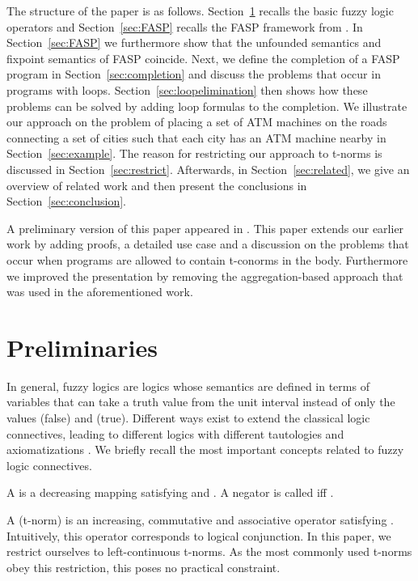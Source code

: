 \documentclass{tlp}
\begin{document}
The structure of the paper is as follows. Section~\ref{sec:prelims} recalls the basic fuzzy logic operators and Section~\ref{sec:FASP}  recalls the FASP framework from \cite{FASP:amai}. In Section~\ref{sec:FASP} we furthermore show that the unfounded semantics and fixpoint semantics of FASP coincide. Next, we define the completion of a FASP program in Section~\ref{sec:completion} and discuss the problems that occur in programs with loops. Section~\ref{sec:loopelimination} then shows how these problems can be solved by adding loop formulas to the completion. We illustrate our approach on the problem of placing a set of ATM machines on the roads connecting a set of cities  such that each city has an ATM machine nearby in Section~\ref{sec:example}. The reason for restricting our approach to t-norms is discussed in Section~\ref{sec:restrict}. Afterwards, in Section~\ref{sec:related}, we give an overview of related work and then present the conclusions in Section~\ref{sec:conclusion}.


A preliminary version of this paper appeared in \cite{FASP-iclp08}. This paper extends our earlier work by adding proofs,
a detailed use case and a discussion on the problems that occur when programs are allowed to contain t-conorms in the body. Furthermore we improved the presentation by removing the aggregation-based approach that was used in the aforementioned work.

\section{Preliminaries}\label{sec:prelims}



In general, fuzzy logics are logics whose semantics are defined in terms of variables that can take a truth value from the unit interval  instead of only the values  (false) and  (true). Different ways exist to extend the classical logic connectives, leading to different logics with different tautologies and axiomatizations \cite{Hajek98,novak:1999}. We briefly recall the most important concepts related to fuzzy logic connectives.

A  is a decreasing  mapping  satisfying  and . A negator is called  iff . 

A  (t-norm) is an increasing, commutative and associative  operator  satisfying . Intuitively, this operator corresponds to logical conjunction. In this paper, we restrict ourselves to left-continuous t-norms. As the most commonly used t-norms obey this restriction, this poses no practical constraint. 
\end{document}
